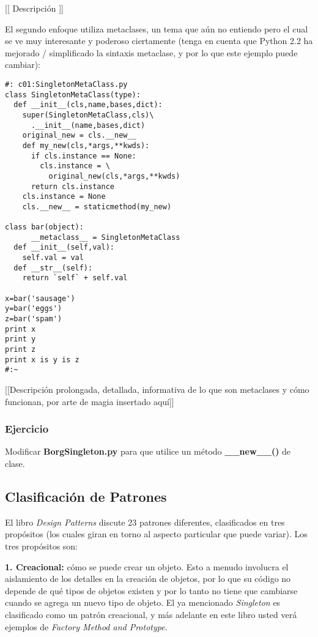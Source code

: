 [[ Descripción ]] \newline

El segundo enfoque utiliza metaclases, un tema que aún no entiendo pero el cual se ve muy interesante y poderoso ciertamente (tenga en cuenta que Python 2.2 ha mejorado / simplificado la sintaxis metaclase, y por lo que este ejemplo puede cambiar): \newline

\begin{lstlisting}
#: c01:SingletonMetaClass.py 
class SingletonMetaClass(type): 
  def __init__(cls,name,bases,dict): 
    super(SingletonMetaClass,cls)\ 
      .__init__(name,bases,dict) 
    original_new = cls.__new__ 
    def my_new(cls,*args,**kwds): 
      if cls.instance == None: 
        cls.instance = \ 
          original_new(cls,*args,**kwds) 
      return cls.instance 
    cls.instance = None 
    cls.__new__ = staticmethod(my_new) 
    
class bar(object): 
      __metaclass__ = SingletonMetaClass 
  def __init__(self,val): 
    self.val = val 
  def __str__(self): 
    return `self` + self.val 
    
x=bar('sausage') 
y=bar('eggs') 
z=bar('spam') 
print x 
print y 
print z 
print x is y is z 
#:~ 
\end{lstlisting}
  
[[Descripción prolongada, detallada, informativa de lo que son metaclases y cómo funcionan, por arte de magia insertado aquí]]    

\subsubsection*{Ejercicio}
Modificar \textbf{BorgSingleton.py} para que utilice un método \textbf{\_\_new\_\_()} de clase.

\subsection{Clasificación de Patrones}

El libro \textit{Design Patterns} discute 23 patrones diferentes, clasificados en tres propósitos (los cuales giran en torno al aspecto particular que puede variar). Los tres propósitos son:  \newline

\textbf{1. Creacional:} 
cómo se puede crear un objeto. Esto a menudo involucra el aislamiento de los detalles en la creación de objetos, por lo que su código no depende de qué tipos de objetos existen y por lo tanto no tiene que cambiarse cuando se agrega un nuevo tipo de objeto. El ya mencionado \textit{Singleton} es clasificado como un patrón creacional, y más adelante en este libro usted verá ejemplos de \textit{Factory Method and Prototype}.     \newline

